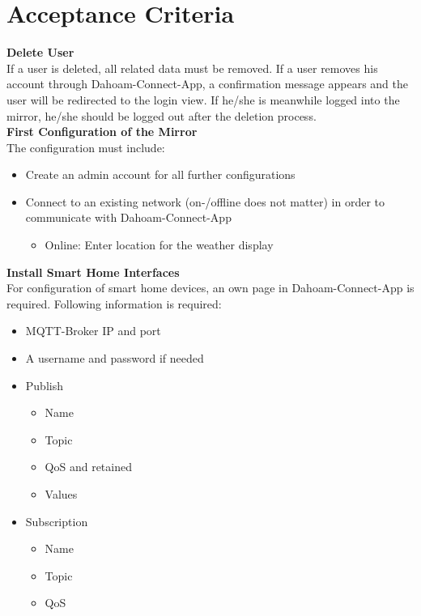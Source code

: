 \documentclass[12pt]{article}
\theoremstyle{definition}
\begin{document}
\pagebreak
\section{Acceptance Criteria}

\textbf{Delete User}\\
If a user is deleted, all related data must be removed. If a user removes his account through Dahoam-Connect-App, a confirmation message appears and the user will be redirected to the login view. If he/she is meanwhile logged into the mirror, he/she should be logged out after the deletion process. \\
\newline
\textbf{First Configuration of the Mirror}\\
The configuration must include:
\begin{itemize}
    \item Create an admin account for all further configurations
    \item Connect to an existing network (on-/offline does not matter) in order to communicate with Dahoam-Connect-App
    \begin{itemize}
        \item Online: Enter location for the weather display
    \end{itemize} 
\end{itemize}
\textbf{Install Smart Home Interfaces}\\
For configuration of smart home devices, an own page in Dahoam-Connect-App is required. Following information is required:
\begin{itemize}
    \item MQTT-Broker IP and port
    \item A username and password if needed
    \item Publish
    \begin{itemize}
        \item Name
        \item Topic
        \item QoS and retained
        \item Values
    \end{itemize}
    \item Subscription
    \begin{itemize}
        \item Name
        \item Topic
        \item QoS
    \end{itemize}
\end{itemize}
\end{document}
